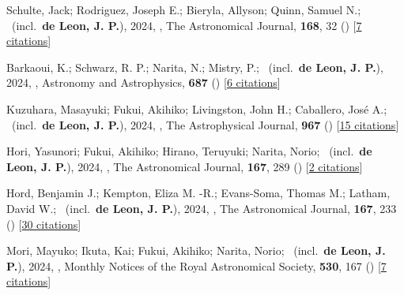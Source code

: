 \item[{\color{numcolor}\scriptsize68}] Schulte, Jack; Rodriguez, Joseph E.; Bieryla, Allyson; Quinn, Samuel N.; \etal\ (incl.\ \textbf{de Leon, J. P.}), 2024, , The Astronomical Journal, \textbf{168}, 32 () [\href{https://ui.adsabs.harvard.edu/abs/2024AJ....168...32S}{7 citations}]

\item[{\color{numcolor}\scriptsize67}] Barkaoui, K.; Schwarz, R. P.; Narita, N.; Mistry, P.; \etal\ (incl.\ \textbf{de Leon, J. P.}), 2024, , Astronomy and Astrophysics, \textbf{687} () [\href{https://ui.adsabs.harvard.edu/abs/2024A&A...687A.264B}{6 citations}]

\item[{\color{numcolor}\scriptsize66}] Kuzuhara, Masayuki; Fukui, Akihiko; Livingston, John H.; Caballero, Jos{\'e} A.; \etal\ (incl.\ \textbf{de Leon, J. P.}), 2024, , The Astrophysical Journal, \textbf{967} () [\href{https://ui.adsabs.harvard.edu/abs/2024ApJ...967L..21K}{15 citations}]

\item[{\color{numcolor}\scriptsize65}] Hori, Yasunori; Fukui, Akihiko; Hirano, Teruyuki; Narita, Norio; \etal\ (incl.\ \textbf{de Leon, J. P.}), 2024, , The Astronomical Journal, \textbf{167}, 289 () [\href{https://ui.adsabs.harvard.edu/abs/2024AJ....167..289H}{2 citations}]

\item[{\color{numcolor}\scriptsize64}] Hord, Benjamin J.; Kempton, Eliza M. -R.; Evans-Soma, Thomas M.; Latham, David W.; \etal\ (incl.\ \textbf{de Leon, J. P.}), 2024, , The Astronomical Journal, \textbf{167}, 233 () [\href{https://ui.adsabs.harvard.edu/abs/2024AJ....167..233H}{30 citations}]

\item[{\color{numcolor}\scriptsize63}] Mori, Mayuko; Ikuta, Kai; Fukui, Akihiko; Narita, Norio; \etal\ (incl.\ \textbf{de Leon, J. P.}), 2024, , Monthly Notices of the Royal Astronomical Society, \textbf{530}, 167 () [\href{https://ui.adsabs.harvard.edu/abs/2024MNRAS.530..167M}{7 citations}]

